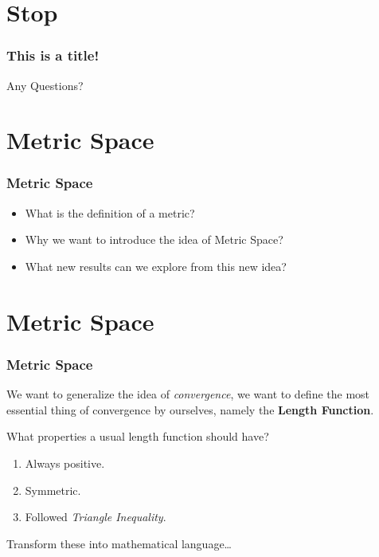 \documentclass[12pt, t]{beamer}
\renewcommand{\emph}[1]{{\color{Turquoise3}\textsl{#1}}}
\begin{document}
\section{Stop}
\begin{frame}
    \frametitle{This is a title!}
\vspace{6em}
\begin{center}
     \Large{Any Questions?}
\end{center}
   
\end{frame}

\section{Metric Space}
\begin{frame}
    \frametitle{Metric Space}
\begin{itemize}
    \item What is the definition of a metric?
    \item Why we want to introduce the idea of Metric Space?
    \item What new results can we explore from this new idea?
\end{itemize}
\end{frame}

\section{Metric Space}
\begin{frame}
    \frametitle{Metric Space}
We want to generalize the idea of \emph{convergence}, we want to define the most essential thing of convergence by ourselves, 
namely the \textbf{Length Function}.\\

\vspace{1em}

What properties a usual length function should have?
\begin{enumerate}
    \item Always positive.
    \item Symmetric.
    \item Followed \emph{Triangle Inequality}.
\end{enumerate}

\vspace{1em}

Transform these into mathematical language\dots
\end{frame}
\end{document}
